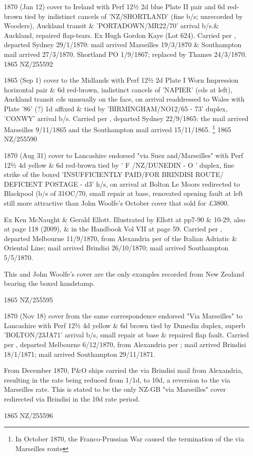 \documentclass[justified]{tufte-book}
\begin{document}
%
{1870 (Jan 12) cover to Ireland with Perf 12½ 2d blue Plate II pair and 6d red-brown tied by indistinct cancels of 'NZ/SHORTLAND' (fine b/s; unrecorded by Wooders), Auckland transit \& 'PORTADOWN/MR22/70' arrival b/s.\& Auckland, repaired flap-tears. Ex Hugh Gordon Kaye (Lot 624). Carried per , departed Sydney 29/1/1870: mail arrived Marseilles 19/3/1870 \& Southampton mail arrived 27/3/1870. Shortland PO 1/9/1867; replaced by Thames 24/3/1870.}%
{1865}%
{NZ/255592}%
{}%
{}
{}%
{}%

%
{1865 (Sep 1) cover to the Midlands with Perf 12½ 2d Plate I Worn Impression horizontal pair \& 6d red-brown, indistinct cancels of 'NAPIER' (cds at left), Auckland transit cds unusually on the face, on arrival readdressed to Wales with Plate '86' (?) 1d affixed \& tied by 'BIRMINGHAM/NO12/65 - 73' duplex, 'CONWY' arrival b/s. Carried per , departed Sydney 22/9/1865: the mail arrived Marseilles 9/11/1865 and the Southampton mail arrived 15/11/1865. \footnote{In October 1870, the Franco-Prussian War caused the termination of the via Marseilles route}}%
{1865}%
{NZ/255590}%
{}%
{}
{}%
{}%

%
{1870 (Aug 31) cover to Lancashire endorsed "via Suez and/Marseilles" with Perf 12½ 4d yellow \& 6d red-brown tied by ' F /NZ/DUNEDIN - O ' duplex, fine strike of the boxed 'INSUFFICIENTLY PAID/FOR BRINDISI ROUTE/ DEFICIENT POSTAGE - d3' h/s, on arrival at Bolton Le Moors redirected to Blackpool (b/s of 31OC/70, small repair at base, renovated opening fault at left still more attractive than John Woolfe's October cover that sold for \pounds{3800}. 

Ex Ken McNaught \& Gerald Ellott. Illustrated by Ellott at pp7-90 \& 10-29, also at page 118 (2009), \& in the Handbook Vol VII at page 59. Carried per , departed Melbourne 11/9/1870, from Alexandria per  of the Italian Adriatic \& Oriental Line; mail arrived Brindisi 26/10/1870; mail arrived Southampton 5/5/1870.

This and John Woolfe's cover are the only examples recorded from New Zealand bearing the boxed handstamp.}%
{1865}%
{NZ/255595}%
{}%
{}
{}%
{}%

%
{1870 (Nov 18) cover from the same correspondence endorsed "Via Marseilles" to Lancashire with Perf 12½ 4d yellow \& 6d brown tied by Dunedin duplex, superb 'BOLTON/23JA71' arrival b/s, small repair at base \& repaired flap fault. Carried per , departed Melbourne 6/12/1870, from Alexandria per ; mail arrived Brindisi 18/1/1871; mail arrived Southampton 29/11/1871.

From December 1870, P\&O ships carried the via Brindisi mail from Alexandria, resulting in the rate being reduced from 1/1d, to 10d, a reversion to the via Marseilles rate. This is stated to be the only NZ-GB "via Marseilles" cover redirected via Brindisi in the 10d rate period.}%
{1865}%
{NZ/255596}%
{}%
{}
{}%
{}%
\end{document}
